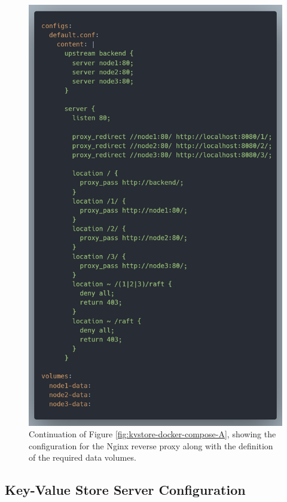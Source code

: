 \begin{figure}[ht]
  \centering
  \includegraphics[width=350pt]{images/kvstore-docker-compose-B.png}
  \caption{Continuation of Figure \ref{fig:kvstore-docker-compose-A}, showing the configuration for the Nginx reverse proxy along with the definition of the required data volumes.}
  \label{fig:kvstore-docker-compose-B}
\end{figure}

\subsection{Key-Value Store Server Configuration}


